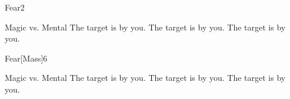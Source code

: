 \begin{spellsection}{Fear}{2}
    \begin{spellheader}
    \end{spellheader}
    \begin{spellcontent}
        \begin{spelltargetinginfo}
        \end{spelltargetinginfo}
        \begin{spelleffects}
            \begin{spellattack}{Magic vs. Mental}
                \spellsuccess The target is \frightened by you.
                \spellcritical The target is \panicked by you.
                \spellfailure The target is \shaken by you.
            \end{spellattack}
            \spelldur \durshort \dismissable
        \end{spelleffects}
    \end{spellcontent}
    \begin{spellfooter}
        \miscastrandom
    \end{spellfooter}
\end{spellsection}

\begin{spellsection}{Fear}[Mass]{6}
    \begin{spellheader}
    \end{spellheader}
    \begin{spellcontent}
        \begin{spelltargetinginfo}
        \end{spelltargetinginfo}
        \begin{spelleffects}
            \begin{spellattack}{Magic vs. Mental}
                \spellsuccess The target is \frightened by you.
                \spellcritical The target is \panicked by you.
                \spellfailure The target is \shaken by you.
            \end{spellattack}
            \spelldur \durshort \dismissable
        \end{spelleffects}
    \end{spellcontent}
    \begin{spellfooter}
        \miscastexplode
    \end{spellfooter}
\end{spellsection}


